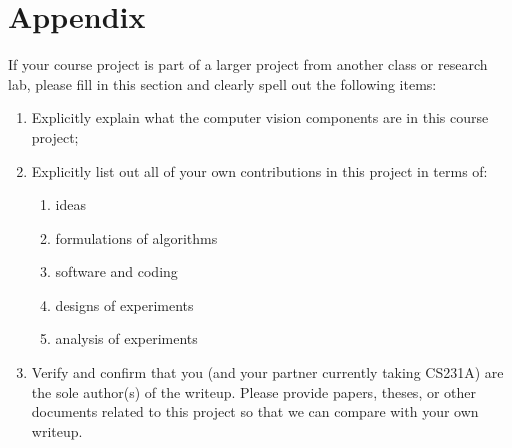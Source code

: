 \documentclass[10pt,twocolumn,letterpaper]{article}
\begin{document}
\section{Appendix}
If your course project is part of a larger project from another class or research lab, please fill in this section and clearly spell out the following items:

\begin{enumerate}
\item  Explicitly explain what the computer vision components are in this course project;
\item  Explicitly list out all of your own contributions in this project in terms of:
	\begin{enumerate}
	\item ideas
	\item formulations of algorithms
 	\item software and coding
	\item designs of experiments
	\item analysis of experiments
	\end{enumerate}
\item Verify and confirm that you (and your partner currently taking CS231A) are the sole author(s) of the writeup.
Please provide papers, theses, or other documents related to this project so that we can compare with your own writeup.
\end{enumerate}
\end{document}
